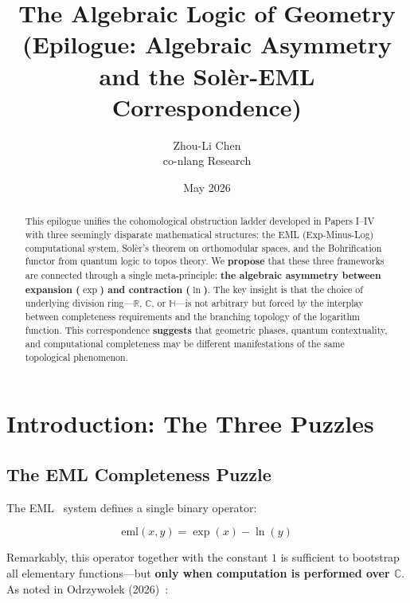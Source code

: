 \documentclass[11pt]{article}
\begin{document}
\title{The Algebraic Logic of Geometry\\
{\large (Epilogue: Algebraic Asymmetry and the Sol\`{e}r-EML Correspondence)}}

\author{Zhou-Li Chen \\ co-nlang Research}
\date{May 2026}

\maketitle

\begin{abstract}
This epilogue unifies the cohomological obstruction ladder developed in Papers I--IV with three seemingly disparate mathematical structures: the EML (Exp-Minus-Log) computational system, Solèr's theorem on orthomodular spaces, and the Bohrification functor from quantum logic to topos theory. We \textbf{propose} that these three frameworks are connected through a single meta-principle: \textbf{the algebraic asymmetry between expansion (\(\exp\)) and contraction (\(\ln\))}. The key insight is that the choice of underlying division ring---$\mathbb{R}$, $\mathbb{C}$, or $\mathbb{H}$---is not arbitrary but forced by the interplay between completeness requirements and the branching topology of the logarithm function. This correspondence \textbf{suggests} that geometric phases, quantum contextuality, and computational completeness may be different manifestations of the same topological phenomenon.
\end{abstract}

\section{Introduction: The Three Puzzles}
\label{introduction-the-three-puzzles}

\subsection{The EML Completeness Puzzle}
\label{the-eml-completeness-puzzle}

The EML~\cite{Odrzy26} system defines a single binary operator:

\[\mathrm{eml}(x, y) = \exp(x) - \ln(y)\]

Remarkably, this operator together with the constant \(1\) is sufficient to bootstrap all elementary functions---but \textbf{only when computation is performed over $\mathbb{C}$}. As noted in Odrzywołek (2026)~\cite{Odrzy26}:
\end{document}
